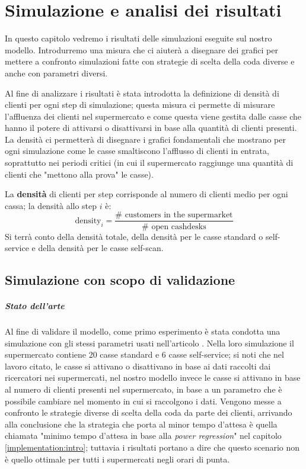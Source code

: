 \chapter{Simulazione e analisi dei risultati}
\label{chapter:simulation}

In questo capitolo vedremo i risultati delle simulazioni eseguite sul nostro modello. Introdurremo una misura che ci aiuterà a disegnare dei grafici per mettere a confronto simulazioni fatte con strategie di scelta della coda diverse e anche con parametri diversi.

\vspace*{1\baselineskip}

Al fine di analizzare i risultati è stata introdotta la definizione di densità di clienti per ogni step di simulazione; questa misura ci permette di misurare l'affluenza dei clienti nel supermercato e come questa viene gestita dalle casse che hanno il potere di attivarsi o disattivarsi in base alla quantità di clienti presenti. La densità ci permetterà di disegnare i grafici fondamentali che mostrano per ogni simulazione come le casse smaltiscono l'afflusso di clienti in entrata, soprattutto nei periodi critici (in cui il supermercato raggiunge una quantità di clienti che "mettono alla prova" le casse).

La \textbf{densità} di clienti per step corrisponde al numero di clienti medio per ogni cassa; la densità allo step $i$ è:
\begin{equation}
	\text{density}_i = \frac{\# \text{ customers in the supermarket}}{\# \text{ open cashdesks}}
\end{equation}
Si terrà conto della densità totale, della densità per le casse standard o self-service e della densità per le casse self-scan.

\section{Simulazione con scopo di validazione}

\paragraph{Stato dell'arte}

Al fine di validare il modello, come primo esperimento è stata condotta una simulazione con gli stessi parametri usati nell'articolo \cite{article1}. Nella loro simulazione il supermercato contiene 20 casse standard e 6 casse self-service; si noti che nel lavoro citato, le casse si attivano o disattivano in base ai dati raccolti dai ricercatori nei supermercati, nel nostro modello invece le casse si attivano in base al numero di clienti presenti nel supermercato, in base a un parametro che è possibile cambiare nel momento in cui si raccolgono i dati. Vengono messe a confronto le strategie diverse di scelta della coda da parte dei clienti, arrivando alla conclusione che la strategia che porta al minor tempo d'attesa è quella chiamata "minimo tempo d'attesa in base alla \textit{power regression}" nel capitolo \ref{implementation:intro}; tuttavia i risultati portano a dire che questo scenario non è quello ottimale per tutti i supermercati negli orari di punta.

